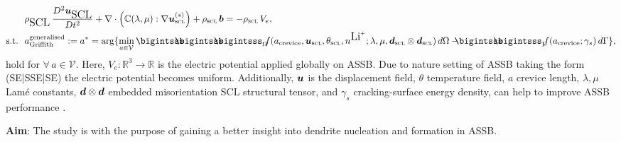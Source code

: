 \documentclass[25pt, a0paper,
portrait,
margin=2mm, 
innermargin=2mm, 
blockverticalspace=7mm, %
colspace=2mm, %
subcolspace=0mm]{tikzposter}
\makeatletter
\newcommand*{\inputfig}[3][htb]{{
    \def\fps@figure{#1}
    \def\DIR{#2}
    \def\LABEL{#3}
    \graphicspath{{\DIR/}}
    
}}
\makeatother
\begin{document}
{\begin{minipage}{0.56\textwidth}
\begin{mdframed}
			\begin{align}
				 & \rho_{\text{\tiny SCL}}\,
				\frac{D^2 \Bu_{\text{\tiny SCL}}}{D t^2}
				+
				\nabla \cdot
				\Big(
				\mathbb{C}(\lambda,\mu)
				:\nabla\Bu^{(s)}_{\textsc{scl}}
				\Big)
				+ \rho_{\textsc{scl}}\, \Bb
				= -\rho_{\textsc{scl}}\, V_{e}, \\
				\text{s.t.}\ \
				 & 
				a_{\text{Griffith}}^{\text{generalised}} := a^{*}
				= \arg \{ \min_{a\in\mathcal{V}}
				{
				\bigintsss\!\!\!\!\!\!\bigintsss\!\!\!\!\!\!\bigintsss_{\Omega}
				\!\!
				f(a_{\text{crevice}},\bm{u}_{\textsc{scl}},\theta_{\textsc{scl}},n^{\text{\tiny Li}^{\tiny +}};\lambda,\mu,\bm{d}_{\textsc{scl}}\otimes\bm{d}_{\textsc{scl}}) \, d\Omega
				- 
				\!\!\!\!
				\bigintsss\!\!\!\!\!\!\bigintsss_{\Gamma}
				\!\!
				f(a_{\text{crevice}};\gamma_{s}) \, d\Gamma
				}
				\},
			\end{align}
			hold for $\forall\,a\in\mathcal{V}$.
			Here, $V_{e}: \mathbb{R}^{3}\to\mathbb{R}$
			is the electric potential applied globally on ASSB.
			Due to nature setting of ASSB taking the form
			(SE|SSE|SE)
			the electric potential becomes uniform.
			Additionally,
			${\boldsymbol{\mathnormal u}}$ is the displacement field,
			$\theta$ temperature field,
			$a$ crevice length,
			$\lambda, \mu$ Lam\'{e} constants,
			${\boldsymbol{\mathnormal d}}\otimes{\boldsymbol{\mathnormal d}}$ embedded misorientation SCL structural tensor,
			and
			$\gamma_{s}$ cracking-surface energy density,
			can help
			to improve ASSB performance
			\cite{vo2023_obms23}\cite{vo2023_cse23}.
		\end{mdframed}
		\vspace{-2mm}
		\begin{mdframed}
			\textbf{Aim}:
			The study is with the purpose of
			gaining a better insight into dendrite nucleation and formation in ASSB.
		\end{mdframed}
	\end{minipage}%
	\hfill
	\begin{minipage}{0.44\textwidth}
		\begin{center}
			\inputfig{floats/routine_woTV_spectral_boschcolor}{routine_woTV_spectral_boschcolor}
			\inputfig{floats/dendrite_SESSE}{dendrite_SESSE}
		\end{center}
	\end{minipage}
	\vspace{-0.3cm}
}
\end{document}
